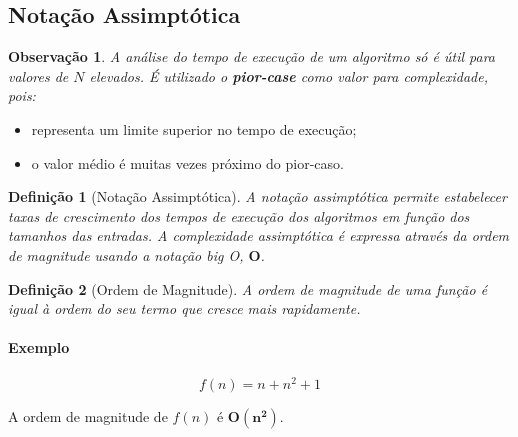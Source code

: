\documentclass[a4paper, 12pt]{article}
\newtheorem{definition}{Definição}[section]
\newtheorem{remark}{Observação}
\begin{document}
\newpage

\subsection{Notação Assimptótica}

\begin{remark}
    A análise do tempo de execução de um algoritmo só é útil para valores de $N$ elevados. É utilizado o \textbf{pior-case} como valor para complexidade, pois:\end{remark}

    \begin{itemize}
        \item representa um limite superior no tempo de execução;
        \item o valor médio é muitas vezes próximo do pior-caso.
    \end{itemize}

\begin{definition}[Notação Assimptótica]
    A notação assimptótica permite estabelecer taxas de crescimento dos tempos de execução dos algoritmos em função dos tamanhos das entradas. A complexidade assimptótica é expressa através da ordem de magnitude usando a notação \emph{big O}, $\mathbf{O}$.
\end{definition}

\begin{definition}[Ordem de Magnitude]
    A ordem de magnitude de uma função é igual à ordem do seu termo que cresce mais rapidamente.
\end{definition}

\paragraph{Exemplo}
    $$
        f(n)=n+n^2+1
    $$

    A ordem de magnitude de $f(n)$ é $\mathbf{O(n^2)}$.
\end{document}
